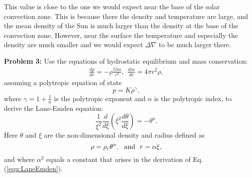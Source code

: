 \documentclass[12pt]{article}
\begin{document}
This value is close to the one we would expect near the base of the
solar convection zone. This is because there the density and
temperature are large, and the mean density of the Sun is much larger
than the density at the base of the convection zone. However, near the
surface the temperature and especially the density are much smaller
and we would expect $\Delta\nabla$ to be much larger there.



{\bf Problem 3:} Use the equations of hydrostatic equilibrium and mass
conservation:
\begin{eqnarray}
  \frac{dp}{dr} = -\rho \frac{Gm}{r^2},\ \ \frac{dm}{dr} = 4\pi r^2\rho, \label{equ:dpdm}
\end{eqnarray}
assuming a polytropic equation of state
\begin{equation}
p = K \rho^\gamma, \label{equ:ppoly}
\end{equation}
where $\gamma = 1 + \frac{1}{n}$ is the polytropic exponent and $n$ is
the polytropic index, to derive the Lane-Emden equation:
\begin{equation}
\frac{1}{\xi^2} \frac{d}{d\xi} \left(\xi^2 \frac{d\theta}{d\xi} \right) = -\theta^n.\label{equ:LaneEmden}
\end{equation}
Here $\theta$ and $\xi$ are the non-dimensional density and radius
defined as
\begin{equation}
\rho = \rho_{\rm c} \theta^n, \ \ \mbox{and}\ \ r = \alpha\xi, \label{equ:rrho}
\end{equation}
and where $\alpha^2$ equals a constant that arises in the derivation
of Eq.(\ref{equ:LaneEmden}).
\end{document}
